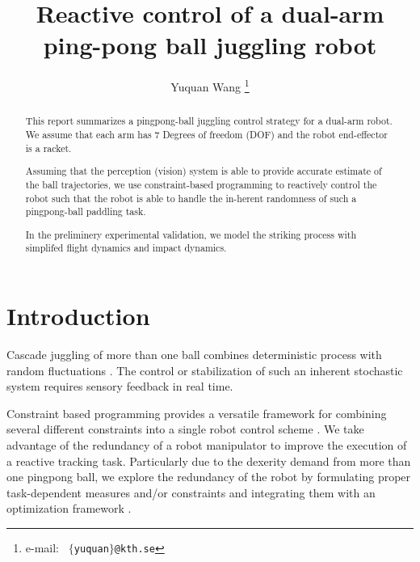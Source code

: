 \documentclass[letterpaper, 10 pt, conference]{ieeeconf}  %
\begin{document}
\title{\LARGE \bf
Reactive control of a dual-arm ping-pong ball juggling robot
}
\author{
  Yuquan Wang 
  \thanks{
    e-mail: \tt{ $\{$yuquan$\}$@kth.se}}
}

\maketitle
\thispagestyle{empty}
\pagestyle{empty}

\begin{abstract}
This report summarizes a pingpong-ball juggling control strategy for a dual-arm robot. We assume that each arm has 7 Degrees of freedom (DOF) and the robot end-effector is a racket. 

Assuming that the perception (vision) system is able to provide accurate estimate of the ball trajectories, we use constraint-based programming to reactively control the robot such that the robot is able to handle the in-herent randomness of such a pingpong-ball paddling task. 


In the preliminery experimental validation, we model the striking process with simplifed flight dynamics and impact dynamics. 

\end{abstract}

\IEEEpeerreviewmaketitle

\section{Introduction }
\label{sec:intro}
Cascade juggling of more than one ball combines deterministic process with random fluctuations \cite{post2000principal}. The control or stabilization of such an inherent stochastic system requires sensory feedback in real time. 


Constraint based programming provides a versatile framework for combining several different constraints into a single robot control scheme \cite{de2007constraint}.
We take advantage of the redundancy of  a robot manipulator to improve the execution of a reactive tracking task. Particularly due to the dexerity demand from  more than one pingpong ball, we explore the redundancy of the robot by formulating proper task-dependent measures and/or constraints and integrating them with an optimization framework \cite{wangIFAC2014}. 
\end{document}
